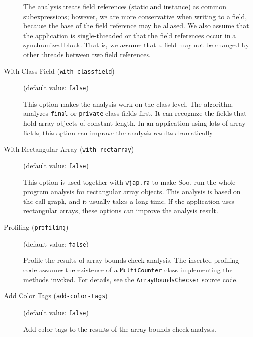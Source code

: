 \documentclass{article}
\begin{document}
\begin{description}
\par

The analysis treats field references (static and instance) as
common subexpressions; however, we are more conservative when
writing to a field, because the base of the field reference may
be aliased. We also assume that the application is
single-threaded or that the field references occur in a
synchronized block. That is, we assume that a field may
not be changed by other threads between two field references.



\item[With Class Field ({\tt with-classfield})]
(default value: {\tt false})





\par

This option makes the analysis work on the class level. The
algorithm analyzes {\tt final} or {\tt private} class
fields first. It can recognize the fields that hold array objects
of constant length.  In an application using lots of array
fields, this option can improve the analysis results
dramatically.



\item[With Rectangular Array ({\tt with-rectarray})]
(default value: {\tt false})




This option is used together with {\tt wjap.ra} to make Soot run the whole-program
analysis for rectangular array objects. This analysis is based on the
call graph, and it usually takes a long time. If the application uses
rectangular arrays, these options can improve the analysis
result.



\item[Profiling ({\tt profiling})]
(default value: {\tt false})





\par

Profile the results of array bounds check analysis.  The inserted
profiling code assumes the existence of a {\tt MultiCounter}
class implementing the methods invoked. For details, see the
{\tt ArrayBoundsChecker} source code.



\item[Add Color Tags ({\tt add-color-tags})]
(default value: {\tt false})



Add color tags to the results of the array bounds check analysis.


\end{description}
\end{document}
